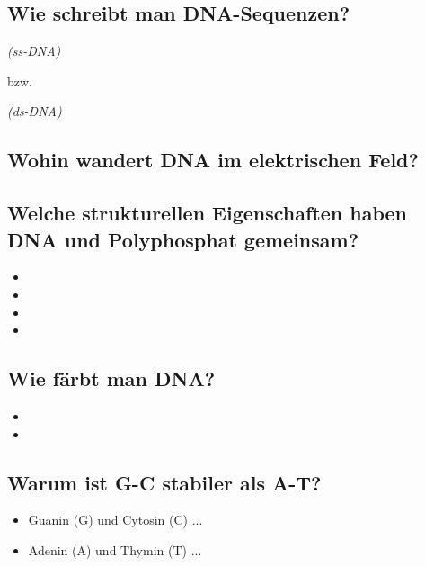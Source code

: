 \documentclass{article}
\begin{document}
\subsection*{Wie schreibt man DNA-Sequenzen?}


\begin{center}
    \textit{(ss-DNA)}
\end{center}
  bzw. \newline

 \begin{center}
    \textit{(ds-DNA)}
\end{center}


\subsection*{Wohin wandert DNA im elektrischen Feld?}

\bigskip\bigskip\bigskip


\subsection*{Welche strukturellen Eigenschaften haben DNA und Polyphosphat gemeinsam? }
\begin{itemize}
    \item 
    \item 
    \item 
    \item 
\end{itemize}

\subsection*{Wie färbt man DNA?}
\begin{itemize}
    \item 
    \item 
\end{itemize}

\subsection*{Warum ist G-C stabiler als A-T?}
\bigskip\bigskip\bigskip

\begin{itemize}
    \item Guanin (G) und Cytosin (C) ...
    \item Adenin (A) und Thymin (T) ...
\end{itemize}
\end{document}
